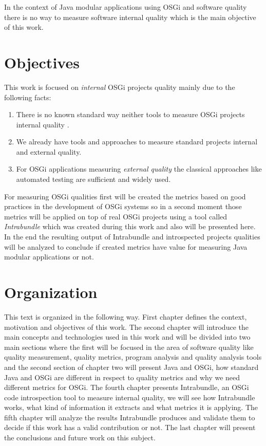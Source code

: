 In the context of Java modular applications using OSGi and software quality there is no way to measure software internal quality which is the main objective of this work.          


\section{Objectives}

This work is focused on \emph{internal} OSGi projects quality mainly due to the following facts:

\begin{enumerate}
  \item There is no known standard way neither tools to measure OSGi projects internal quality \citep{Hamza 2013}.
  \item We already have tools and approaches to measure standard projects internal and external quality.
  \item For OSGi applications measuring \emph{external quality} the classical approaches like automated testing are sufficient and widely used.
\end{enumerate}
For measuring OSGi qualities first will be created the metrics based on good practices in the development of OSGi systems so in a second moment those metrics will be applied on top of real OSGi projects using a tool called \emph{Intrabundle} which was created during this work and also will be presented here. In the end the resulting output of Intrabundle and introspected projects qualities will be analyzed to conclude if created metrics have value for measuring Java modular applications or not.  

 
\section{Organization}

This text is organized in the following way. First chapter defines the context, motivation and objectives of this work. The second chapter will introduce the main concepts and technologies used in this work and will be divided into two main sections where the first will be focused in the area of software quality like quality measurement, quality metrics, program analysis and quality analysis tools and the second section of chapter two will present Java and OSGi, how standard Java and OSGi are different in respect to quality metrics and why we need different metrics for OSGi. The fourth chapter presents Intrabundle, an OSGi code introspection tool to measure internal quality, we will see how Intrabundle works, what kind of information it extracts and what metrics it is applying. The fifth chapter will analyze the results Intrabundle produces and validate them to decide if this work has a valid contribution or not. The last chapter will present the conclusions and future work on this subject.